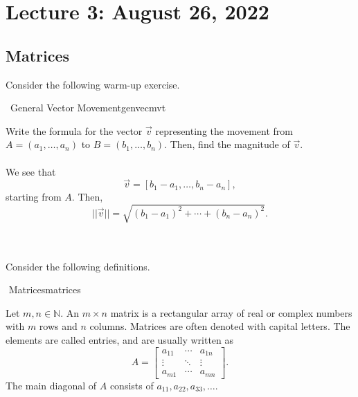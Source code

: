 \pagebreak

\section{Lecture 3: August 26, 2022}

    \subsection{Matrices}

        Consider the following warm-up exercise.
        \begin{example}{\Difficulty\,\Difficulty\,\,General Vector Movement}{genvecmvt}

            Write the formula for the vector \(\vec{v}\) representing the movement from \(A=(a_1,\ldots,a_n)\) to \(B=(b_1,\ldots,b_n)\). Then, find the magnitude of \(\vec{v}\).
            \\
            \\
            We see that
            \begin{equation*}
                \vec{v}=[b_1-a_1,\ldots,b_n-a_n],
            \end{equation*}
            starting from \(A\). Then,
            \begin{equation*}
                ||\vec{v}||=\sqrt{(b_1-a_1)^2+\cdots+(b_n-a_n)^2}.
            \end{equation*}
        
        \end{example}
        \vphantom
        \\
        \\
        Consider the following definitions.
        \begin{definition}{\Stop\,\,Matrices}{matrices}
        
            Let \(m,n\in\mathbb{N}\). An \(m\times n\) matrix is a rectangular array of real or complex numbers with \(m\) rows and \(n\) columns. Matrices are often denoted with capital letters. The elements are called entries, and are usually written as
            \begin{equation*}
                A=\begin{bmatrix} a_{11} & \cdots & a_{1n} \\ \vdots & \ddots & \vdots \\ a_{m1} & \cdots & a_{mn} \end{bmatrix}.
            \end{equation*}
            The main diagonal of \(A\) consists of \(a_{11},a_{22},a_{33},\ldots\).
        
        \end{definition}

